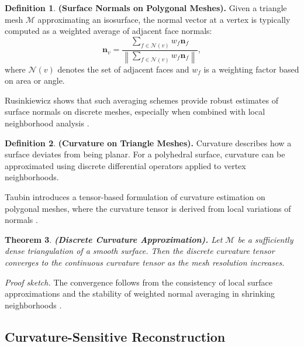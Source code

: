 \documentclass[12pt, a4paper, oneside]{book}
\theoremstyle{plain}
\newtheorem{theorem}{Theorem}[chapter]
\theoremstyle{definition}
\newtheorem{definition}[theorem]{Definition}
\theoremstyle{remark}
\theoremstyle{definition}
\begin{document}
\vspace{0.5em}

\begin{definition}
    \textbf{ (Surface Normals on Polygonal Meshes).}
Given a triangle mesh $\mathcal{M}$ approximating an isosurface, the normal vector at a vertex is typically computed as a weighted average of adjacent face normals:
\[
\mathbf{n}_v = \frac{\sum_{f \in \mathcal{N}(v)} w_f \mathbf{n}_f}{\left\|\sum_{f \in \mathcal{N}(v)} w_f \mathbf{n}_f \right\|},
\]
where $\mathcal{N}(v)$ denotes the set of adjacent faces and $w_f$ is a weighting factor based on area or angle.
\end{definition}


Rusinkiewicz shows that such averaging schemes provide robust estimates of surface normals on discrete meshes, especially when combined with local neighborhood analysis \cite{rusinkiewicz2004estimating}.

\vspace{0.5em}

\begin{definition}
    \textbf{ (Curvature on Triangle Meshes).}
Curvature describes how a surface deviates from being planar. For a polyhedral surface, curvature can be approximated using discrete differential operators applied to vertex neighborhoods.

\end{definition}

Taubin introduces a tensor-based formulation of curvature estimation on polygonal meshes, where the curvature tensor is derived from local variations of normals \cite{taubin1995estimating}.

\begin{theorem}
    \textbf{ (Discrete Curvature Approximation).}
Let $\mathcal{M}$ be a sufficiently dense triangulation of a smooth surface. Then the discrete curvature tensor converges to the continuous curvature tensor as the mesh resolution increases.
\end{theorem}

\textit{Proof sketch.} The convergence follows from the consistency of local surface approximations and the stability of weighted normal averaging in shrinking neighborhoods \cite{taubin1995estimating}.

\vspace{0.5em}

\subsection{Curvature-Sensitive Reconstruction}
\end{document}
